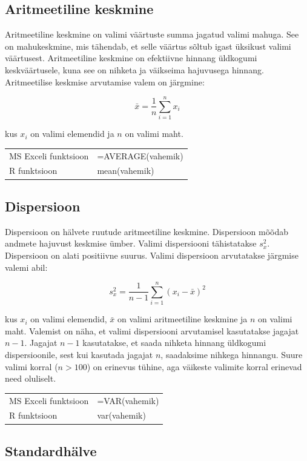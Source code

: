 \documentclass[
]{book}
\theoremstyle{definition}
\theoremstyle{definition}
\theoremstyle{definition}
\theoremstyle{definition}
\theoremstyle{remark}
\begin{document}
\subsection{Aritmeetiline keskmine}\label{aritmeetiline-keskmine-1}

Aritmeetiline keskmine on valimi väärtuste summa jagatud valimi mahuga. See on mahukeskmine, mis tähendab, et selle väärtus sõltub igast üksikust valimi väärtusest. Aritmeetiline keskmine on efektiivne hinnang üldkogumi keskväärtusele, kuna see on nihketa ja väikseima hajuvusega hinnang. Aritmeetilise keskmise arvutamise valem on järgmine:

\[\bar{x} = \frac{1}{n} \sum_{i=1}^{n} x_i\]

kus \(x_i\) on valimi elemendid ja \(n\) on valimi maht.

\begin{tabular}{ll}
MS Exceli funktsioon & =AVERAGE(vahemik)\\
R funktsioon & mean(vahemik) \\
\end{tabular}

\subsection{Dispersioon}\label{dispersioon}

Dispersioon on hälvete ruutude aritmeetiline keskmine. Dispersioon mõõdab andmete hajuvust keskmise ümber. Valimi dispersiooni tähistatakse \(s_x^2\). Dispersioon on alati positiivne suurus. Valimi dispersioon arvutatakse järgmise valemi abil:

\[s_x^2 = \frac{1}{n-1} \sum_{i=1}^{n} (x_i - \bar{x})^2\]

kus \(x_i\) on valimi elemendid, \(\bar{x}\) on valimi aritmeetiline keskmine ja \(n\) on valimi maht. Valemist on näha, et valimi dispersiooni arvutamisel kasutatakse jagajat \(n-1\). Jagajat \(n-1\) kasutatakse, et saada nihketa hinnang üldkogumi dispersioonile, sest kui kasutada jagajat \(n\), saadaksime nihkega hinnangu. Suure valimi korral (\(n > 100\)) on erinevus tühine, aga väikeste valimite korral erinevad need oluliselt.

\begin{tabular}{ll}
MS Exceli funktsioon & =VAR(vahemik)\\
R funktsioon & var(vahemik) \\
\end{tabular}

\subsection{Standardhälve}\label{standardhuxe4lve}
\end{document}
